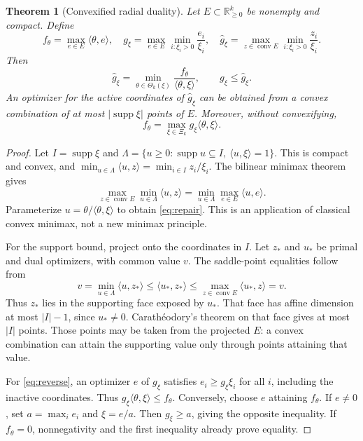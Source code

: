 \documentclass[11pt,a4paper]{article}
\newtheorem{theorem}{Theorem}
\newcommand{\R}{\mathbb R}
\newcommand{\conv}{\operatorname{conv}}
\newcommand{\supp}{\operatorname{supp}}
\begin{document}
\begin{theorem}[Convexified radial duality]\label{thm:convex}
Let \(E\subset\R_{\ge0}^k\) be nonempty and compact. Define
\[
 f_\theta=\max_{e\in E}\langle\theta,e\rangle,\quad
 g_\xi=\max_{e\in E}\min_{i:\xi_i>0}\frac{e_i}{\xi_i},\quad
 \widehat g_\xi=\max_{z\in\conv E}
                    \min_{i:\xi_i>0}\frac{z_i}{\xi_i}.
\]
Then
\begin{equation}
 \widehat g_\xi
 =\min_{\theta\in\Theta_k(\xi)}
       \frac{f_\theta}{\langle\theta,\xi\rangle},
 \qquad g_\xi\le\widehat g_\xi.
 \label{eq:repair}
\end{equation}
An optimizer for the active coordinates of \(\widehat g_\xi\)
can be obtained from a convex combination of at most
\(|\supp\xi|\) points of \(E\). Moreover, without convexifying,
\begin{equation}
 f_\theta=\max_{\xi\in\Xi_k}g_\xi\langle\theta,\xi\rangle.
 \label{eq:reverse}
\end{equation}
\end{theorem}
\begin{proof}
Let \(I=\supp\xi\) and
\(\Lambda=\{u\ge0:\supp u\subseteq I,\ \langle u,\xi\rangle=1\}\).
This is compact and convex, and
\(\min_{u\in\Lambda}\langle u,z\rangle=\min_{i\in I}z_i/\xi_i\).
The bilinear minimax theorem gives
\[
 \max_{z\in\conv E}\min_{u\in\Lambda}\langle u,z\rangle
 =\min_{u\in\Lambda}\max_{e\in E}\langle u,e\rangle.
\]
Parameterize \(u=\theta/\langle\theta,\xi\rangle\) to obtain
\eqref{eq:repair}. This is an application of classical convex
minimax, not a new minimax principle.

For the support bound, project onto the coordinates in \(I\).
Let \(z_*\) and \(u_*\) be primal and dual optimizers, with common
value \(v\). The saddle-point equalities follow from
\[
 v=\min_{u\in\Lambda}\langle u,z_*\rangle
 \le\langle u_*,z_*\rangle
 \le\max_{z\in\conv E}\langle u_*,z\rangle=v.
\]
Thus \(z_*\) lies in the supporting face exposed by \(u_*\).
That face has affine dimension at most \(|I|-1\), since
\(u_*\ne0\). Carath\'eodory's theorem on that face gives at most
\(|I|\) points. Those points may be taken from the projected \(E\):
a convex combination can attain the supporting value only through
points attaining that value.

For \eqref{eq:reverse}, an optimizer \(e\) of \(g_\xi\) satisfies
\(e_i\ge g_\xi\xi_i\) for all \(i\), including the inactive coordinates.
Thus \(g_\xi\langle\theta,\xi\rangle\le f_\theta\).
Conversely, choose \(e\) attaining \(f_\theta\). If \(e\ne0\), set
\(a=\max_i e_i\) and \(\xi=e/a\). Then \(g_\xi\ge a\), giving the
opposite inequality. If \(f_\theta=0\), nonnegativity and the first
inequality already prove equality.
\end{proof}
\end{document}
